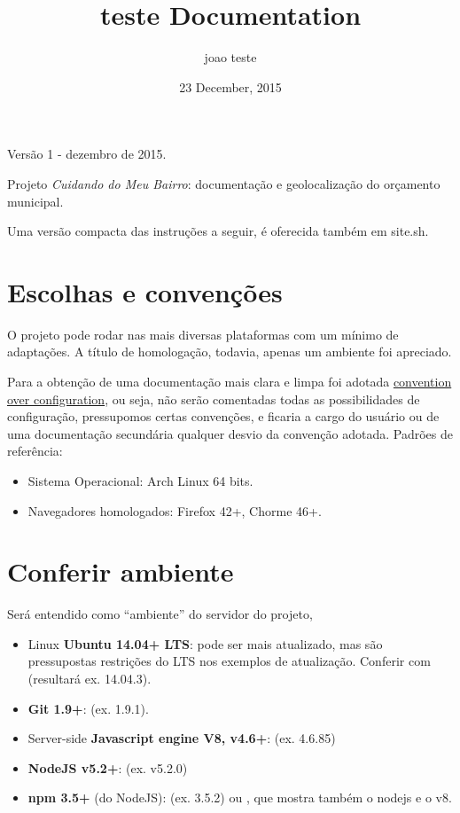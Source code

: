 \documentclass[letterpaper,10pt,portuges]{sphinxmanual}
\title{teste Documentation}
\date{23 December, 2015}
\author{joao teste}
\begin{document}
\maketitle
\tableofcontents
{}\label{index::doc}


Versão 1 - dezembro de 2015.

Projeto \emph{Cuidando do Meu Bairro}: documentação e geolocalização do orçamento municipal.

Uma versão compacta das instruções a seguir, é oferecida também em site.sh.


\chapter{Escolhas e convenções}
\label{install-site::doc}\label{install-site:escolhas-e-convencoes}\label{install-site:cuidando-do-meu-bairro}
O projeto pode rodar nas mais diversas plataformas com um mínimo de
adaptações. A título de homologação, todavia, apenas um ambiente foi
apreciado.

Para a obtenção de uma documentação mais clara e limpa foi adotada
\href{https://en.wikipedia.org/wiki/Convention\_over\_configuration}{convention over
configuration},
ou seja, não serão comentadas todas as possibilidades de configuração,
pressupomos certas convenções, e ficaria a cargo do usuário ou de uma
documentação secundária qualquer desvio da convenção adotada. Padrões de
referência:
\begin{itemize}
\item {} 
Sistema Operacional: Arch Linux 64 bits.

\item {} 
Navegadores homologados: Firefox 42+, Chorme 46+.

\end{itemize}


\chapter{Conferir ambiente}
\label{install-site:conferir-ambiente}
Será entendido como ``ambiente'' do servidor do projeto,
\begin{itemize}
\item {} 
Linux \textbf{Ubuntu 14.04+ LTS}: pode ser mais atualizado, mas são
pressupostas restrições do LTS nos exemplos de atualização. Conferir
com  (resultará ex. 14.04.3).

\item {} 
\textbf{Git 1.9+}:  (ex. 1.9.1).

\item {} 
Server-side \textbf{Javascript engine V8, v4.6+}:
 (ex. 4.6.85)

\item {} 
\textbf{NodeJS v5.2+}: (ex. v5.2.0)

\item {} 
\textbf{npm 3.5+} (do NodeJS):  (ex. 3.5.2) ou ,
que mostra também o nodejs e o v8.

\end{itemize}
\end{document}
